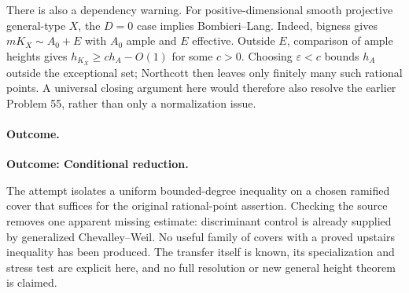 \documentclass[11pt,a4paper]{article}
\newcommand{\eps}{\varepsilon}
\numberwithin{equation}{section}
\begin{document}
There is also a dependency warning. For positive-dimensional smooth projective general-type $X$, the $D=0$ case implies Bombieri--Lang. Indeed, bigness gives $mK_X\sim A_0+E$ with $A_0$ ample and $E$ effective. Outside $E$, comparison of ample heights gives $h_{K_X}\ge c h_A-O(1)$ for some $c>0$. Choosing $\eps<c$ bounds $h_A$ outside the exceptional set; Northcott then leaves only finitely many such rational points. A universal closing argument here would therefore also resolve the earlier Problem 55, rather than only a normalization issue.

\paragraph{Outcome.}
\textbf{Outcome: Conditional reduction.}

The attempt isolates a uniform bounded-degree inequality on a chosen ramified cover that suffices for the original rational-point assertion. Checking the source removes one apparent missing estimate: discriminant control is already supplied by generalized Chevalley--Weil. No useful family of covers with a proved upstairs inequality has been produced. The transfer itself is known, its specialization and stress test are explicit here, and no full resolution or new general height theorem is claimed.

\end{document}
